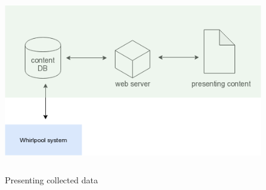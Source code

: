 \begin{figure}[h!]
  \centering
  \includegraphics[width=13cm,height=8cm,keepaspectratio]{../media/crawler/data-collection.png}
  \caption{Presenting collected data}
  \label{fig:datacollect}
\end{figure}

\pagebreak